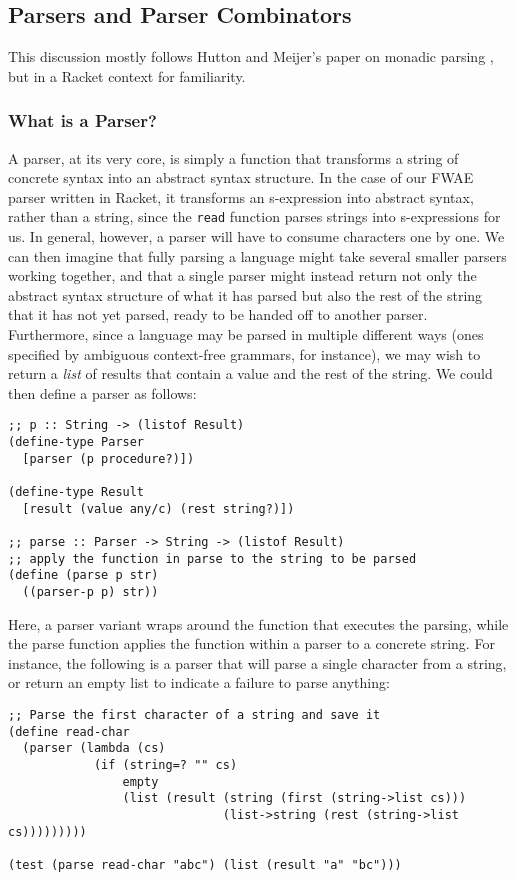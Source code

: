 
\subsection{Parsers and Parser Combinators}
This discussion mostly follows Hutton and Meijer's paper on monadic parsing \cite{monadic-parsing}, but in a Racket context for familiarity.
\subsubsection{What is a Parser?}
A parser, at its very core, is simply a function that transforms a string of concrete syntax into an abstract syntax structure. In the case of our FWAE parser written in Racket, it transforms an s-expression into abstract syntax, rather than a string, since the \texttt{read} function parses strings into s-expressions for us. In general, however, a parser will have to consume characters one by one. We can then imagine that fully parsing a language might take several smaller parsers working together, and that a single parser might instead return not only the abstract syntax structure of what it has parsed but also the rest of the string that it has not yet parsed, ready to be handed off to another parser. Furthermore, since a language may be parsed in multiple different ways (ones specified by ambiguous context-free grammars, for instance), we may wish to return a \textit{list} of results that contain a value and the rest of the string. We could then define a parser as follows:
\begin{verbatim}
;; p :: String -> (listof Result)
(define-type Parser
  [parser (p procedure?)])

(define-type Result
  [result (value any/c) (rest string?)])
  
;; parse :: Parser -> String -> (listof Result)
;; apply the function in parse to the string to be parsed
(define (parse p str)
  ((parser-p p) str))
\end{verbatim}
Here, a parser variant wraps around the function that executes the parsing, while the parse function applies the function within a parser to a concrete string. For instance, the following is a parser that will parse a single character from a string, or return an empty list to indicate a failure to parse anything:
\begin{verbatim}
;; Parse the first character of a string and save it
(define read-char
  (parser (lambda (cs)
            (if (string=? "" cs)
                empty
                (list (result (string (first (string->list cs)))
                              (list->string (rest (string->list cs)))))))))
                              
(test (parse read-char "abc") (list (result "a" "bc")))
\end{verbatim}
